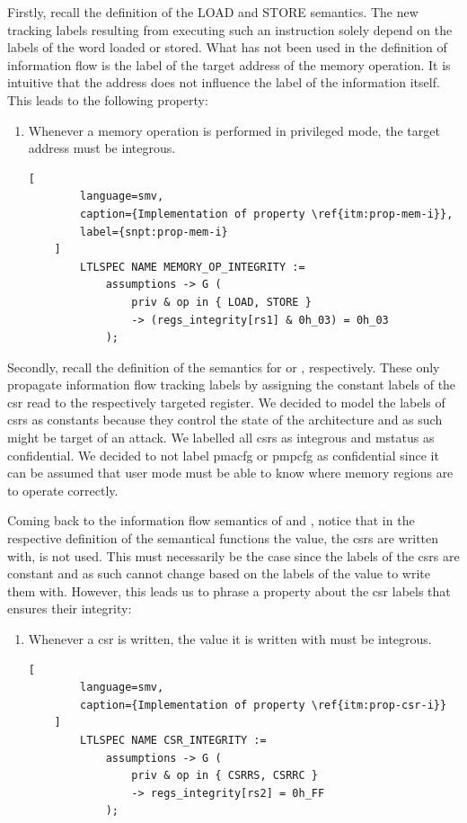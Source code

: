 Firstly, recall the definition of the LOAD and STORE semantics.
The new tracking labels resulting from executing such an instruction solely depend on the labels of the word loaded or stored.
What has not been used in the definition of information flow is the label of the target address of the memory operation.
It is intuitive that the address does not influence the label of the information itself.
This leads to the following property:
\begin{enumerate}[label=\Roman*.,series=]
    \item \label{itm:prop-mem-i}
    Whenever a memory operation is performed in privileged mode, the target address must be integrous.

    \begin{lstlisting}[
        language=smv,
        caption={Implementation of property \ref{itm:prop-mem-i}},
        label={snpt:prop-mem-i}
    ]
        LTLSPEC NAME MEMORY_OP_INTEGRITY :=
            assumptions -> G (
                priv & op in { LOAD, STORE }
                -> (regs_integrity[rs1] & 0h_03) = 0h_03
            );
    \end{lstlisting}
\end{enumerate}

Secondly, recall the definition of the semantics for  or , respectively.
These only propagate information flow tracking labels by assigning the constant labels of the \gls{csr} read to the respectively targeted register.
We decided to model the labels of \glspl{csr} as constants because they control the state of the architecture and as such might be target of an attack.
We labelled all \glspl{csr} as integrous and \gls{mstatus} as confidential.
We decided to not label \gls{pmacfg} or \gls{pmpcfg} as confidential since it can be assumed that user mode must be able to know where memory regions are to operate correctly.

Coming back to the information flow semantics of  and , notice that in the respective definition of the semantical functions the value, the \glspl{csr} are written with, is not used.
This must necessarily be the case since the labels of the \glspl{csr} are constant and as such cannot change based on the labels of the value to write them with.
However, this leads us to phrase a property about the \gls{csr} labels that ensures their integrity:
\begin{enumerate}[label=\Roman*.,resume]
    \item \label{itm:prop-csr-i}
    Whenever a \gls{csr} is written, the value it is written with must be integrous.

    \begin{lstlisting}[
        language=smv,
        caption={Implementation of property \ref{itm:prop-csr-i}}
    ]
        LTLSPEC NAME CSR_INTEGRITY :=
            assumptions -> G (
                priv & op in { CSRRS, CSRRC }
                -> regs_integrity[rs2] = 0h_FF
            );
    \end{lstlisting}
\end{enumerate}


